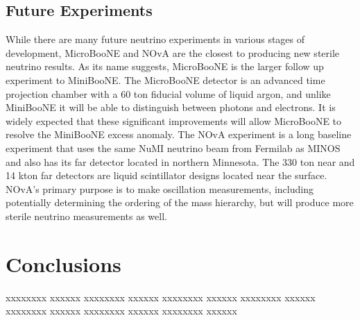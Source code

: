 \documentclass[aps,prd,twocolumn,nofootinbib]{revtex4-1}
\begin{document}
\subsection{Future Experiments}
While there are many future neutrino experiments in various stages of development, MicroBooNE and NOvA are the closest to producing new sterile neutrino results. As its name suggests, MicroBooNE is the larger follow up experiment to MiniBooNE. The MicroBooNE detector is an advanced time projection chamber with a 60 ton fiducial volume of liquid argon, and unlike MiniBooNE it will be able to distinguish between photons and electrons. It is widely expected that these significant improvements will allow MicroBooNE to resolve the MiniBooNE excess anomaly. The NOvA experiment is a long baseline experiment that uses the same NuMI neutrino beam from Fermilab as MINOS and also has its far detector located in northern Minnesota. The 330 ton near and 14 kton far detectors are liquid scintillator designs located near the surface. NOvA's primary purpose is to make oscillation measurements, including potentially determining the ordering of the mass hierarchy, but will produce more sterile neutrino measurements as well.

\section{Conclusions}
xxxxxxxx xxxxxx xxxxxxxx xxxxxx xxxxxxxx xxxxxx xxxxxxxx xxxxxx xxxxxxxx xxxxxx xxxxxxxx xxxxxx xxxxxxxx xxxxxx
\end{document}
